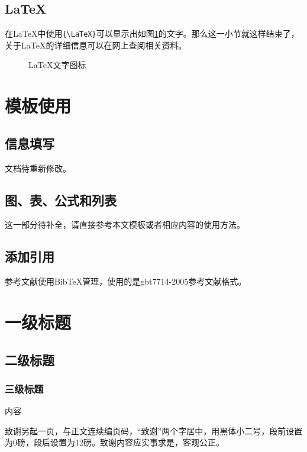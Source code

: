 \documentclass{ecustbachelorthesis}
\begin{document}
\section{LaTeX}
\begin{sectext}
在LaTeX中使用\verb${\LaTeX}$可以显示出如图\ref{fig:latex}的文字\cite{latex}。那么这一小节就这样结束了，关于LaTeX的详细信息可以在网上查阅相关资料。
\setlength{\belowcaptionskip}{-10pt}
\vspace{-7pt}
\begin{figure}[!htbp]
  \centering
  \vspace{-5pt}\caption{LaTeX文字图标}
  \label{fig:latex}
\end{figure}
\end{sectext}
\chapter{模板使用}
\section{信息填写}
\begin{sectext}
文档待重新修改。
\end{sectext}
\section{图、表、公式和列表}
\begin{sectext}
这一部分待补全，请直接参考本文模板或者相应内容的使用方法。
\end{sectext}
\section{添加引用}
参考文献使用BibTeX管理，使用的是gbt7714-2005参考文献格式\cite{gbt}。
\chapter{一级标题}
\section{二级标题}
\subsection{三级标题}
内容
\nocite{*}

\acknowledgment
致谢另起一页，与正文连续编页码，“致谢”两个字居中，用黑体小二号，段前设置为0磅，段后设置为12磅。致谢内容应实事求是，客观公正。\cite{ecustack}
\end{document}
